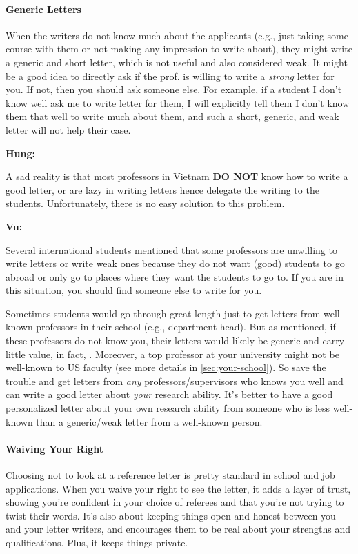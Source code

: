 \documentclass[oneside,11pt,dvipsnames]{book}
\newenvironment{commentbox}[1][]{
  \small
  \begin{mybox}
    {\small \textbf{#1}}
  }{
  \end{mybox}
}
\newcommand{\red}[1]{{\color{red}{#1}}}
\begin{document}
\paragraph{Generic Letters} When the writers do not know much about the applicants (e.g., just taking some course with them or not making any impression to write about), they might write a generic and short letter, which is not useful and also considered weak.  It might be a good idea to directly ask if the prof. is willing to write a \emph{strong} letter for you. If not, then you should ask someone else.  For example, if a student I don't know well ask me to write letter for them, I will explicitly tell them I don't know them that well to write much about them, and such a short, generic, and weak letter will not help their case.

\begin{commentbox}[Hung:]
  A sad reality is that most professors in Vietnam \textbf{DO NOT} know how to write a good letter, or are lazy in writing letters hence delegate the writing to the students. Unfortunately, there is no easy solution to this problem.
\end{commentbox}

\begin{commentbox}[Vu:]

  Several international students mentioned that some professors are unwilling to write letters or write weak ones because they do not want (good) students to go abroad or only go to places where they want the students to go to. If you are in this situation, you should find someone else to write for you.
  \tcblower

  Sometimes students would go through great length just to get letters from well-known professors in their school (e.g., department head). But as mentioned, if these professors do not know you, their letters would likely be generic and carry little value, in fact, \red{red flags}. Moreover, a top professor at your university might not be well-known to US faculty (see more details in \autoref{sec:your-school}). So save the trouble and  get letters from \emph{any} professors/supervisors who knows you well and can write a good letter about \emph{your} research ability. It's better to have a good personalized
  letter about your own research ability from someone who is less
  well-known than a generic/weak letter from a well-known person.

\end{commentbox}

\paragraph{Waiving Your Right}  Choosing not to look at a reference letter is pretty standard in school and job applications. When you waive your right to see the letter, it adds a layer of trust, showing you're confident in your choice of referees and that you're not trying to twist their words. It's also about keeping things open and honest between you and your letter writers, and encourages them to be real about your strengths and qualifications. Plus, it keeps things private.
\end{document}
